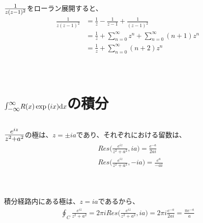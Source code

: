 \documentclass[dvipdfmx,a4paper]{jsarticle}
\begin{document}
 \subsection{}
 $\mbox{\large$\frac{1}{z(z-1)^2}$}$をローラン展開すると、
 \begin{align*}
 \frac{1}{z(z-1)^2} &= \frac{1}{z} - \frac{1}{z-1} + \frac{1}{(z-1)^2} \\
 &= \frac{1}{z} + \sum_{n = 0}^{\infty}z^n + \sum_{n = 0}^{\infty}(n+1)z^n \\
 &= \frac{1}{z} + \sum_{n = 0}^{\infty}(n+2)z^n
\end{align*}
\\\\

\section{$\mbox{\Large$\int_{-\infty}^{\infty}$}R(x)\exp{(ix)}\mathrm{d}x$の積分}
\subsection{}
 $\mbox{\Large$\frac{e^{iz}}{z^2 + a^2}$}$の極は、$z = \pm ia$であり、それぞれにおける留数は、
 \begin{align*}
 &Res\biggl(\frac{e^{iz}}{z^2 + a^2}, ia\biggr) = \frac{e^{-a}}{2ai}\\
 &Res\biggl(\frac{e^{iz}}{z^2 + a^2}, -ia\biggr) = \frac{e^{a}}{-ai}\\
 \end{align*}
 \\
 
\subsection{}
 積分経路内にある極は、$z = ia$であるから、
 \begin{align*}
 \oint_{C}\frac{e^{iz}}{z^2 + a^2} = 2\pi iRes\biggl(\frac{e^{iz}}{z^2 + a^2}, ia\biggr) = 2\pi i\frac{e^{-a}}{2ai} = \frac{\pi e^{-a}}{a}
 \end{align*}
 \\
 
\end{document}

